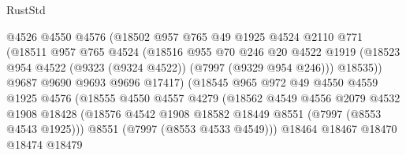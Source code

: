 \begin{lexlean}{RustStd}
\begin{coremodule}
{\begin{coremodule}
{{{{{{{{{{{{{{{{{{{{{{{{{{{{{{{{{{{{{{{{{{{                            @4526
                            @4550
                            @4576
                            (@18502
                              @957
                              @765
                              @49
                              @1925
                              @4524
                              @2110
                              @771
                              (@18511
                                @957
                                @765
                                @4524
                                (@18516
                                  @955
                                  @70
                                  @246
                                  @20
                                  @4522
                                  @1919
                                  (@18523
                                    @954
                                    @4522
                                    (@9323 (@9324 @4522))
                                    (@7997 (@9329 @954 @246)))
                                  @18535))
                              @9687
                              @9690
                              @9693
                              @9696
                              @17417)
                            (@18545
                              @965
                              @972
                              @49
                              @4550
                              @4559
                              @1925
                              @4576
                              (@18555
                                @4550
                                @4557
                                @4279
                                (@18562
                                  @4549
                                  @4556
                                  @2079
                                  @4532
                                  @1908
                                  @18428
                                  (@18576
                                    @4542
                                    @1908
                                    @18582
                                    @18449
                                    @8551
                                    (@7997 (@8553 @4543 @1925)))
                                  @8551
                                  (@7997 (@8553 @4533 @4549)))
                                @18464
                                @18467
                                @18470
                                @18474
                                @18479
}}}}}}}}}}}}}}}}}}}}}}}}}}}}}}}}}}}}}}}}}}}
\end{coremodule}}
\end{coremodule}
\end{lexlean}
